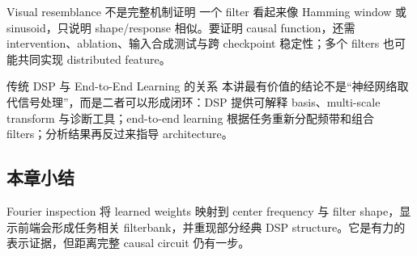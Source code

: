 
\begin{warningbox}{Visual resemblance 不是完整机制证明}
一个 filter 看起来像 Hamming window 或 sinusoid，只说明 shape/response 相似。要证明 causal function，还需 intervention、ablation、输入合成测试与跨 checkpoint 稳定性；多个 filters 也可能共同实现 distributed feature。
\end{warningbox}

\begin{importantbox}{传统 DSP 与 End-to-End Learning 的关系}
本讲最有价值的结论不是“神经网络取代信号处理”，而是二者可以形成闭环：DSP 提供可解释 basis、multi-scale transform 与诊断工具；end-to-end learning 根据任务重新分配频带和组合 filters；分析结果再反过来指导 architecture。
\end{importantbox}

\subsection{本章小结}

Fourier inspection 将 learned weights 映射到 center frequency 与 filter shape，显示前端会形成任务相关 filterbank，并重现部分经典 DSP structure。它是有力的表示证据，但距离完整 causal circuit 仍有一步。

